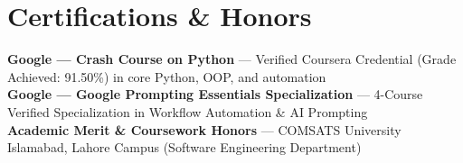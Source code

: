 \documentclass[letterpaper,10pt]{article}
\begin{document}
\section{Certifications \& Honors}
 \begin{itemize}[leftmargin=0.15in, label={}]
    \small{\item{
     \textbf{Google --- Crash Course on Python} --- Verified Coursera Credential (Grade Achieved: 91.50\%) in core Python, OOP, and automation \\ \vspace{2pt}
     \textbf{Google --- Google Prompting Essentials Specialization} --- 4-Course Verified Specialization in Workflow Automation \& AI Prompting \\ \vspace{2pt}
     \textbf{Academic Merit \& Coursework Honors} --- COMSATS University Islamabad, Lahore Campus (Software Engineering Department)
    }}
 \end{itemize}
\end{document}
